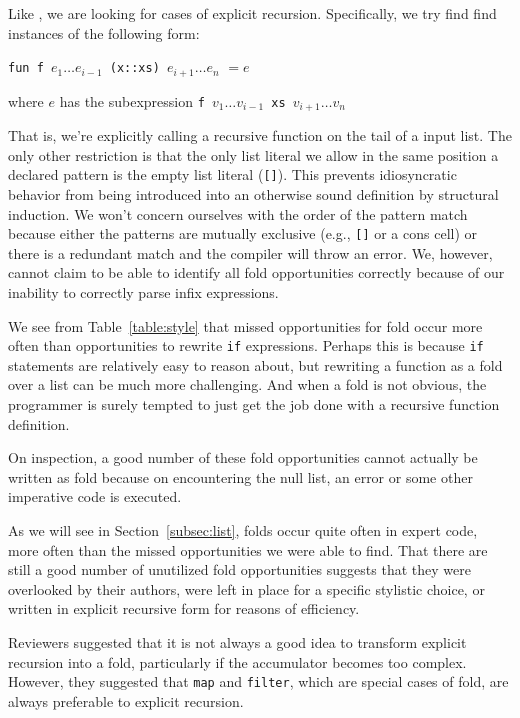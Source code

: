 \documentclass[12pt,abstracton]{scrartcl}
\begin{document}
Like \cite{Jeu13}, we are looking for cases of explicit recursion. Specifically, we try find
find instances of the following form:
\begin{center}
\texttt{fun f }\(e_{1}\ldots e_{i-1}\)\texttt{ (x::xs) }\(e_{i+1}\ldots e_{n}\) \(= e\)

where $e$ has the subexpression \texttt{f }\(v_{1}\ldots v_{i-1}\)\texttt{ xs }\(v_{i+1}\ldots v_{n}\)
\end{center}
That is, we're explicitly calling a recursive function on the tail of a input list.
The only other restriction is that the only list literal we allow in the same position
a declared pattern is the empty list literal (\texttt{[]}). This prevents idiosyncratic
behavior from being introduced into an otherwise sound definition by structural induction.
We won't concern ourselves with the order of the pattern match because either the patterns
are mutually exclusive (e.g., \texttt{[]} or a cons cell) or there is a redundant match
and the compiler will throw an error. We, however, cannot claim to be able to identify all
fold opportunities correctly because of our inability to correctly parse infix expressions.

We see from Table~\ref{table:style} that missed opportunities for fold occur more often
than opportunities to rewrite \texttt{if} expressions. Perhaps this is
because \texttt{if} statements are relatively easy to reason about, but
rewriting a function as a fold over a list can be much more challenging.
And when a fold is not obvious, the programmer is surely tempted to just
get the job done with a recursive function definition.

On inspection, a good number of these fold opportunities cannot actually
be written as fold because on encountering the null list, an error or
some other imperative code is executed.

As we will see in Section~\ref{subsec:list}, folds occur quite often in
expert code, more often than the missed opportunities we were able to find.
That there are still a good number of unutilized fold opportunities
suggests that they were overlooked by their authors,
were left in place for a specific stylistic choice, or
written in explicit recursive form for reasons of efficiency.

Reviewers suggested that it is not always a good idea to transform
explicit recursion into a fold, particularly if the accumulator becomes
too complex. However, they suggested that \texttt{map} and \texttt{filter}, which are
special cases of fold, are always preferable to explicit recursion.
\end{document}
